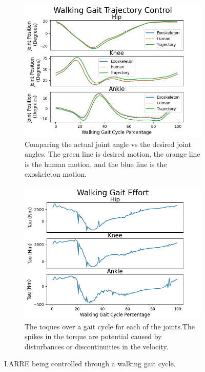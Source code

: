  
 \begin{figure}[h!]
    \begin{subfigure}{0.5\textwidth}
        \centering
        \captionsetup{width=.8\linewidth}%
        \includegraphics[width=\linewidth]{images/sim/walkjoints.png}
        \caption{Comparing the actual joint angle vs the desired joint angles. The green line is desired motion, the orange line is the human motion, and the blue line is the exoskeleton motion.}
        \label{fig:simwalkingTraj}
    \end{subfigure}
    \begin{subfigure}{0.5\textwidth}
        \centering
        \captionsetup{width=.8\linewidth}%
        \includegraphics[width=\linewidth]{images/sim/walktau.png}
        \caption{The toques over a gait cycle for each of the joints.The spikes in the torque are potential caused by disturbances or discontinuities in the velocity. }
    \label{fig:simwalkingtorque}
\end{subfigure}
    \caption[LARRE Simulation Gait Kinematics]{LARRE being controlled through a walking gait cycle.}
    \label{fig:simwalking}
\end{figure}
 
